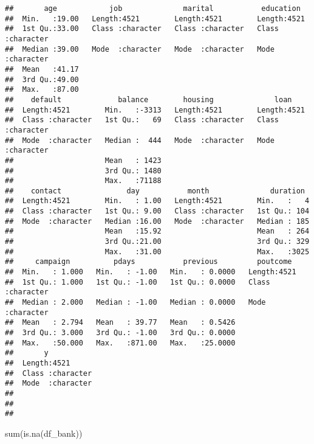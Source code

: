 \documentclass[
]{article}
\newenvironment{Shaded}{\begin{snugshade}}{\end{snugshade}}
\newcommand{\FunctionTok}[1]{\textcolor[rgb]{0.00,0.00,0.00}{#1}}
\newcommand{\NormalTok}[1]{#1}
\begin{document}
\begin{verbatim}
##       age            job              marital           education        
##  Min.   :19.00   Length:4521        Length:4521        Length:4521       
##  1st Qu.:33.00   Class :character   Class :character   Class :character  
##  Median :39.00   Mode  :character   Mode  :character   Mode  :character  
##  Mean   :41.17                                                           
##  3rd Qu.:49.00                                                           
##  Max.   :87.00                                                           
##    default             balance        housing              loan          
##  Length:4521        Min.   :-3313   Length:4521        Length:4521       
##  Class :character   1st Qu.:   69   Class :character   Class :character  
##  Mode  :character   Median :  444   Mode  :character   Mode  :character  
##                     Mean   : 1423                                        
##                     3rd Qu.: 1480                                        
##                     Max.   :71188                                        
##    contact               day           month              duration   
##  Length:4521        Min.   : 1.00   Length:4521        Min.   :   4  
##  Class :character   1st Qu.: 9.00   Class :character   1st Qu.: 104  
##  Mode  :character   Median :16.00   Mode  :character   Median : 185  
##                     Mean   :15.92                      Mean   : 264  
##                     3rd Qu.:21.00                      3rd Qu.: 329  
##                     Max.   :31.00                      Max.   :3025  
##     campaign          pdays           previous         poutcome        
##  Min.   : 1.000   Min.   : -1.00   Min.   : 0.0000   Length:4521       
##  1st Qu.: 1.000   1st Qu.: -1.00   1st Qu.: 0.0000   Class :character  
##  Median : 2.000   Median : -1.00   Median : 0.0000   Mode  :character  
##  Mean   : 2.794   Mean   : 39.77   Mean   : 0.5426                     
##  3rd Qu.: 3.000   3rd Qu.: -1.00   3rd Qu.: 0.0000                     
##  Max.   :50.000   Max.   :871.00   Max.   :25.0000                     
##       y            
##  Length:4521       
##  Class :character  
##  Mode  :character  
##                    
##                    
## 
\end{verbatim}

\begin{Shaded}
\begin{Highlighting}[]
\FunctionTok{sum}\NormalTok{(}\FunctionTok{is.na}\NormalTok{(df\_bank))}
\end{Highlighting}
\end{Shaded}
\end{document}
